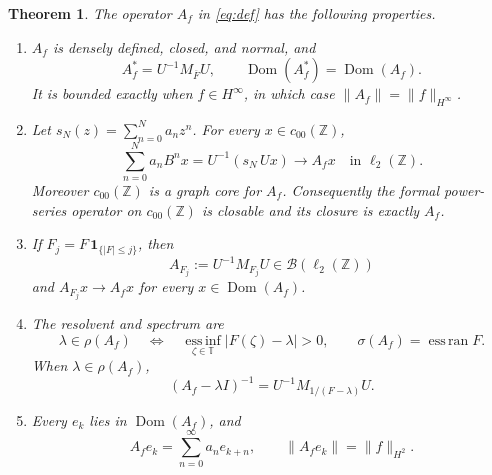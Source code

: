 \documentclass[11pt]{article}
\newtheorem{theorem}{Theorem}
\theoremstyle{remark}
\newcommand{\T}{\mathbb{T}}
\newcommand{\Z}{\mathbb{Z}}
\newcommand{\norm}[1]{\lVert #1\rVert}
\newcommand{\Dom}{\operatorname{Dom}}
\newcommand{\essran}{\operatorname{ess\,ran}}
\newcommand{\essinf}{\operatorname*{ess\,inf}}
\begin{document}
\begin{theorem}\label{thm:main}
The operator \(A_f\) in \eqref{eq:def} has the following properties.
\begin{enumerate}[label=\textup{(\roman*)},leftmargin=1.1cm]
\item \(A_f\) is densely defined, closed, and normal, and
\[
 A_f^*=U^{-1}M_{\overline F}U,
 \qquad
 \Dom(A_f^*)=\Dom(A_f).
\]
It is bounded exactly when \(f\in H^\infty\), in which case
\(\norm{A_f}=\norm f_{H^\infty}\).
\item Let \(s_N(z)=\sum_{n=0}^Na_nz^n\).  For every
\(x\in c_{00}(\Z)\),
\[
 \sum_{n=0}^Na_nB^nx
 =U^{-1}(s_N\,Ux)\longrightarrow A_fx
 \quad\text{in }\ell_2(\Z).
\]
Moreover \(c_{00}(\Z)\) is a graph core for \(A_f\).  Consequently the
formal power-series operator on \(c_{00}(\Z)\) is closable and its closure is
exactly \(A_f\).
\item If \(F_j=F\,\mathbf 1_{\{|F|\le j\}}\), then
\[
 A_{F_j}:=U^{-1}M_{F_j}U\in\mathcal B(\ell_2(\Z))
\]
and \(A_{F_j}x\to A_fx\) for every \(x\in\Dom(A_f)\).
\item The resolvent and spectrum are
\[
 \lambda\in\rho(A_f)
 \quad\Longleftrightarrow\quad
 \essinf_{\zeta\in\T}|F(\zeta)-\lambda|>0,
 \qquad
 \sigma(A_f)=\essran F.
\]
When \(\lambda\in\rho(A_f)\),
\[
 (A_f-\lambda I)^{-1}
 =U^{-1}M_{1/(F-\lambda)}U.
\]
\item Every \(e_k\) lies in \(\Dom(A_f)\), and
\[
 A_fe_k=\sum_{n=0}^{\infty}a_ne_{k+n},
 \qquad
 \norm{A_fe_k}=\norm f_{H^2}.
\]
\end{enumerate}
\end{theorem}
\end{document}
